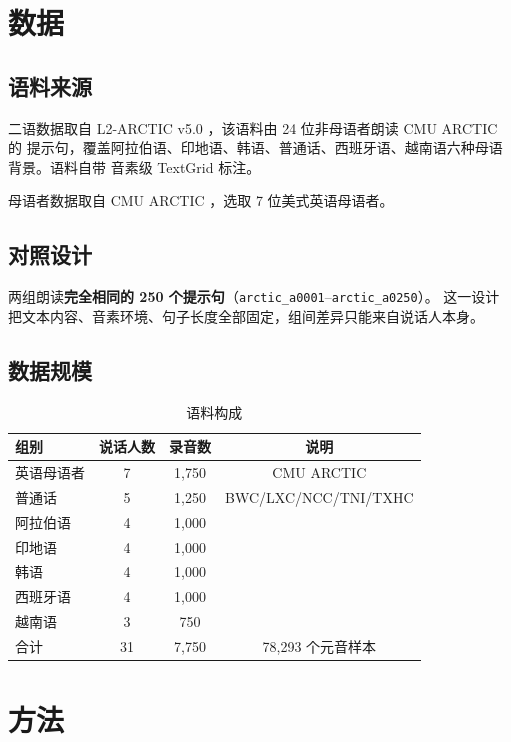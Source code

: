 \documentclass[11pt,a4paper]{ctexart}
\begin{document}
\section{数据}

\subsection{语料来源}

二语数据取自 L2-ARCTIC v5.0 \cite{l2arctic}，该语料由 24 位非母语者朗读 CMU ARCTIC 的
提示句，覆盖阿拉伯语、印地语、韩语、普通话、西班牙语、越南语六种母语背景。语料自带
音素级 TextGrid 标注。

母语者数据取自 CMU ARCTIC \cite{cmuarctic}，选取 7 位美式英语母语者。

\subsection{对照设计}

两组朗读\textbf{完全相同的 250 个提示句}（\texttt{arctic\_a0001}–\texttt{arctic\_a0250}）。
这一设计把文本内容、音素环境、句子长度全部固定，组间差异只能来自说话人本身。

\subsection{数据规模}

\begin{table}[htbp]
\centering
\caption{语料构成}
\label{tab:data}
\begin{tabular}{lccc}
\toprule
组别 & 说话人数 & 录音数 & 说明 \\
\midrule
英语母语者 & 7 & 1{,}750 & CMU ARCTIC \\
普通话 & 5 & 1{,}250 & BWC/LXC/NCC/TNI/TXHC \\
阿拉伯语 & 4 & 1{,}000 & \\
印地语 & 4 & 1{,}000 & \\
韩语 & 4 & 1{,}000 & \\
西班牙语 & 4 & 1{,}000 & \\
越南语 & 3 & 750 & \\
\midrule
合计 & 31 & 7{,}750 & 78{,}293 个元音样本 \\
\bottomrule
\end{tabular}
\end{table}

\section{方法}
\end{document}
